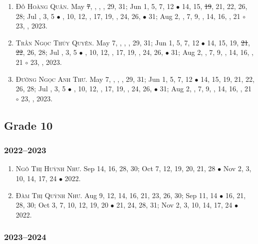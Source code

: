 \documentclass{article}
\begin{document}
\begin{enumerate}
	\item \textsc{Đỗ Hoàng Quân.} May \st{7}, , , , 29, 31; Jun 1, 5, 7, 12 $\bullet$ 14, 15, \st{19}, 21, 22, 26, 28; Jul , 3, 5 $\bullet$ , 10, 12, , 17, 19, , 24, 26,  $\bullet$ 31; Aug 2, , 7, 9, , 14, 16, , 21 $\circ$ 23, , 2023.
	\item \textsc{Trần Ngọc Thúy Quyên.} May 7, , , , 29, 31; Jun 1, 5, 7, 12 $\bullet$ 14, 15, 19, \st{21}, \st{22}, 26, 28; Jul , 3, 5 $\bullet$ , 10, 12, , 17, 19, , 24, 26,  $\bullet$ 31; Aug 2, , 7, 9, , 14, 16, , 21 $\circ$ 23, , 2023.
	\item \textsc{Đường Ngọc Anh Thư.} May 7, , , , 29, 31; Jun 1, 5, 7, 12 $\bullet$ 14, 15, 19, 21, 22, 26, 28; Jul , 3, 5 $\bullet$ , 10, 12, , 17, 19, , 24, 26,  $\bullet$ 31; Aug 2, , 7, 9, , 14, 16, , 21 $\circ$ 23, , 2023.
\end{enumerate}


\subsection{Grade 10}

\subsubsection{2022--2023}

\begin{enumerate}
	\item \textsc{Ngô Thị Huỳnh Như.} {\sf[In]} Sep 14, 16, 28, 30; Oct 7, 12, 19, 20, 21, 28 $\bullet$ Nov 2, 3, 10, 14, 17, 24 $\bullet$ 2022. {\sf[Out]}
	\item \textsc{Đàm Thị Quỳnh Như.} {\sf[In]} Aug 9, 12, 14, 16, 21, 23, 26, 30; Sep 11, 14 $\bullet$ 16, 21, 28, 30; Oct 3, 7, 10, 12, 19, 20 $\bullet$ 21, 24, 28, 31; Nov 2, 3, 10, 14, 17, 24 $\bullet$ 2022. {\sf[Out]}
\end{enumerate}

\subsubsection{2023--2024}
\end{document}
